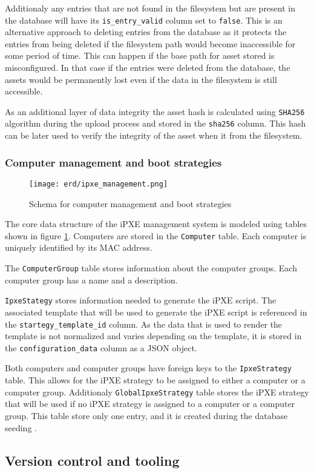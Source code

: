 \documentclass[../main.tex]{subfiles}
\begin{document}
Additionaly any entries that are not found in the filesystem but are present in the database will have its \texttt{is\_entry\_valid} column set to \texttt{false}.
This is an alternative approach to deleting entries from the database as it protects the entries from being deleted if the filesystem path would become inaccessible for some period of time.
This can happen if the base path for asset stored is misconfigured. In that case if the entries were deleted from the database, the assets would be permanently lost even if the data in the filesystem is still accessible.

As an additional layer of data integrity the asset hash is calculated using \texttt{SHA256} \cite{sha256} algorithm during the upload process and stored in the \texttt{sha256} column.
This hash can be later used to verify the integrity of the asset when it from the filesystem.

\subsubsection{Computer management and boot strategies}

\begin{figure}[H]
  \centering
  \texttt{[image: erd/ipxe\_management.png]}
  \caption{Schema for computer management and boot strategies}
  \label{fig:erd_ipxe_management}
\end{figure}

The core data structure of the iPXE management system is modeled using tables shown in figure \ref{fig:erd_ipxe_management}.
Computers are stored in the \texttt{Computer} table. Each computer is uniquely identified by its MAC address.

The \texttt{ComputerGroup} table stores information about the computer groups. Each computer group has a name and a description.

\texttt{IpxeStategy} stores information needed to generate the iPXE script.
The associated template that will be used to generate the iPXE script is referenced in the \texttt{startegy\_template\_id} column.
As the data that is used to render the template is not normalized and varies depending on the template, it is stored in the \texttt{configuration\_data} column as a JSON object.

Both computers and computer groups have foreign keys to the \texttt{IpxeStrategy} table. This allows for the iPXE strategy to be assigned to either a computer or a computer group.
Additionaly \texttt{GlobalIpxeStrategy} table stores the iPXE strategy that will be used if no iPXE strategy is assigned to a computer or a computer group.
This table store only one entry, and it is created during the database seeding \cite{prisma-seeding}.



\subsection{Version control and tooling}
\end{document}
